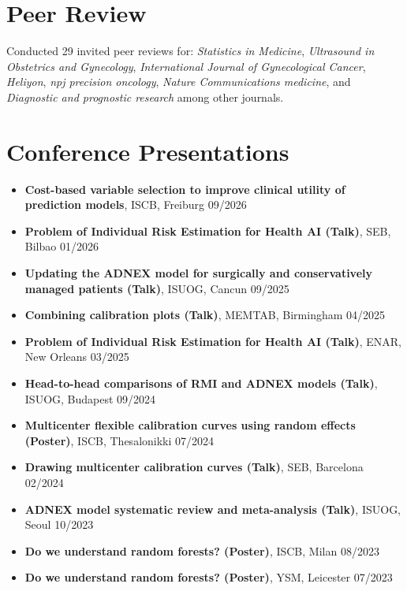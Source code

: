\section*{Peer Review}

Conducted 29 invited peer reviews for: \textit{Statistics in Medicine}, \textit{Ultrasound in Obstetrics and Gynecology}, \textit{International Journal of Gynecological Cancer}, \textit{Heliyon}, \textit{npj precision oncology}, \textit{Nature Communications medicine}, and \textit{Diagnostic and prognostic research} among other journals.

\section*{Conference Presentations}

\begin{itemize}
    \item \textbf{Cost-based variable selection to improve clinical utility of prediction models}, ISCB, Freiburg \hfill 09/2026
    \item \textbf{Problem of Individual Risk Estimation for Health AI (Talk)}, SEB, Bilbao \hfill 01/2026
    \item \textbf{Updating the ADNEX model for surgically and conservatively managed patients (Talk)}, ISUOG, Cancun \hfill 09/2025
    \item \textbf{Combining calibration plots (Talk)}, MEMTAB, Birmingham \hfill 04/2025
    \item \textbf{Problem of Individual Risk Estimation for Health AI (Talk)}, ENAR, New Orleans \hfill 03/2025
    \item \textbf{Head-to-head comparisons of RMI and ADNEX models (Talk)}, ISUOG, Budapest \hfill 09/2024
    \item \textbf{Multicenter flexible calibration curves using random effects (Poster)}, ISCB, Thesalonikki \hfill 07/2024
    \item \textbf{Drawing multicenter calibration curves (Talk)}, SEB, Barcelona \hfill 02/2024
    \item \textbf{ADNEX model systematic review and meta-analysis (Talk)}, ISUOG, Seoul \hfill 10/2023
    \item \textbf{Do we understand random forests? (Poster)}, ISCB, Milan \hfill 08/2023
    \item \textbf{Do we understand random forests? (Poster)}, YSM, Leicester \hfill 07/2023
\end{itemize}

